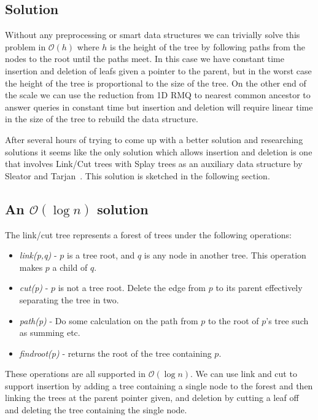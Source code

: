 \documentclass[a4paper,oneside,article,11pt]{memoir}
\begin{document}
\subsection{Solution}
Without any preprocessing or smart data structures we can trivially solve this problem in $\mathcal{O}(h)$ where $h$ is the height of the tree by following paths from the nodes to the root until the paths meet. In this case we have constant time insertion and deletion of leafs given a pointer to the parent, but in the worst case the height of the tree is proportional to the size of the tree. On the other end of the scale we can use the reduction from 1D RMQ to nearest common ancestor to answer queries in constant time but insertion and deletion will require linear time in the size of the tree to rebuild the data structure.

After several hours of trying to come up with a better solution and researching solutions it seems like the only solution which allows insertion and deletion is one that involves Link/Cut trees with Splay trees as an auxiliary data structure by Sleator and Tarjan~\cite{Sleator1985}. This solution is sketched in the following section.

\subsection{An $\mathcal{O}(\log n)$ solution}
The link/cut tree represents a forest of trees under the following operations:
\begin{itemize}
	\item{\textit{link(p,q)} - $p$ is a tree root, and $q$ is any node in another tree. This operation makes $p$ a child of $q$.}
	\item{\textit{cut(p)} - $p$ is not a tree root. Delete the edge from $p$ to its parent effectively separating the tree in two.}
	\item{\textit{path(p)} - Do some calculation on the path from $p$ to the root of $p$'s tree such as summing etc.}
	\item{\textit{findroot(p)} - returns the root of the tree containing $p$.}
\end{itemize}

These operations are all supported in $\mathcal{O}(\log n)$. We can use link and cut to support insertion by adding a tree containing a single node to the forest and then linking the trees at the parent pointer given, and deletion by cutting a leaf off and deleting the tree containing the single node.
\end{document}
